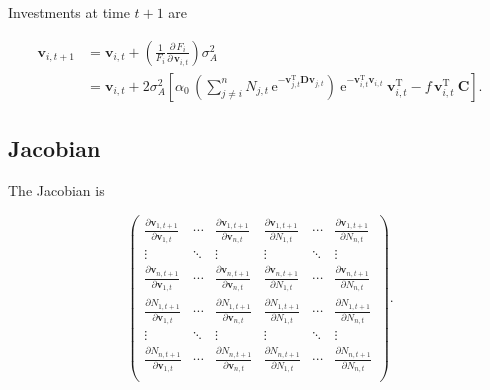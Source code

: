 Investments at time $t+1$ are

\begin{equation} \label{eq:matrix-invest-change}
\begin{split}
    \mathbf{v}_{i,t+1} &= \mathbf{v}_{i,t} + \left( \frac{1}{F_i}
        \frac{\partial \, F_i}{\partial \, \mathbf{v}_{i,t}} \right) \sigma^2_A \\
     &= \mathbf{v}_{i,t} + 2 \sigma_A^2
    \left[
        \alpha_0 \, \left(
            \sum_{j \ne i}^{n}{ N_{j,t} \, \textrm{e}^{
            - \mathbf{v}_{j,t}^{\textrm{T}}
            \mathbf{D} \mathbf{v}_{j,t} } }
        \right) \:
            \textrm{e}^{- \mathbf{v}_{i,t}^{\textrm{T}} \mathbf{v}_{i,t}} \:
            \mathbf{v}_{i,t}^{\textrm{T}}
        - f \, \mathbf{v}_{i,t}^{\textrm{T}} \: \mathbf{C}
    \right]
    \textrm{.}
\end{split}
\end{equation}







\subsection*{Jacobian}

The Jacobian is

\begin{equation} \label{eq:jacobian}
    \begin{pmatrix}
        \frac{\partial \mathbf{v}_{1,t+1}}{\partial \mathbf{v}_{1,t}} & \cdots &
            \frac{\partial \mathbf{v}_{1,t+1}}{\partial \mathbf{v}_{n,t}} &
            \frac{\partial \mathbf{v}_{1,t+1}}{\partial N_{1,t}} & \cdots &
            \frac{\partial \mathbf{v}_{1,t+1}}{\partial N_{n,t}} \\
        \vdots & \ddots & \vdots & \vdots & \ddots & \vdots \\
        \frac{\partial \mathbf{v}_{n,t+1}}{\partial \mathbf{v}_{1,t}} & \cdots &
            \frac{\partial \mathbf{v}_{n,t+1}}{\partial \mathbf{v}_{n,t}} &
            \frac{\partial \mathbf{v}_{n,t+1}}{\partial N_{1,t}} & \cdots &
            \frac{\partial \mathbf{v}_{n,t+1}}{\partial N_{n,t}} \\[1ex]
%
%
        \frac{\partial N_{1,t+1}}{\partial \mathbf{v}_{1,t}} & \cdots &
            \frac{\partial N_{1,t+1}}{\partial \mathbf{v}_{n,t}} &
            \frac{\partial N_{1,t+1}}{\partial N_{1,t}} & \cdots &
            \frac{\partial N_{1,t+1}}{\partial N_{n,t}} \\
        \vdots & \ddots & \vdots & \vdots & \ddots & \vdots \\
        \frac{\partial N_{n,t+1}}{\partial \mathbf{v}_{1,t}} & \cdots &
            \frac{\partial N_{n,t+1}}{\partial \mathbf{v}_{n,t}} &
            \frac{\partial N_{n,t+1}}{\partial N_{1,t}} & \cdots &
            \frac{\partial N_{n,t+1}}{\partial N_{n,t}} \\
    \end{pmatrix}
    \text{.}
\end{equation}


